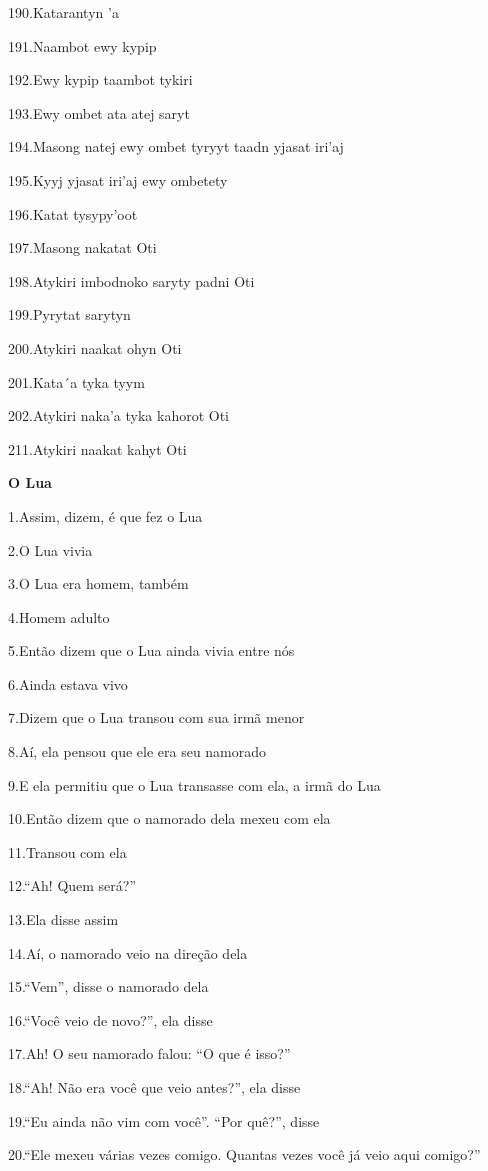 190.Katarantyn 'a

191.Naambot ewy kypip

192.Ewy kypip taambot tykiri

193.Ewy ombet ata atej saryt

194.Masong natej ewy ombet tyryyt taadn yjasat iri'aj

195.Kyyj yjasat iri'aj ewy ombetety

196.Katat tysypy'oot

197.Masong nakatat Oti

198.Atykiri imbodnoko saryty padni Oti

199.Pyrytat sarytyn

200.Atykiri naakat ohyn Oti

201.Kata´a tyka tyym

202.Atykiri naka'a tyka kahorot Oti

211.Atykiri naakat kahyt Oti

\textbf{O Lua}

1.Assim, dizem, é que fez o Lua

2.O Lua vivia

3.O Lua era homem, também

4.Homem adulto

5.Então dizem que o Lua ainda vivia entre nós

6.Ainda estava vivo

7.Dizem que o Lua transou com sua irmã menor

8.Aí, ela pensou que ele era seu namorado

9.E ela permitiu que o Lua transasse com ela, a irmã do Lua

10.Então dizem que o namorado dela mexeu com ela

11.Transou com ela

12.``Ah! Quem será?''

13.Ela disse assim

14.Aí, o namorado veio na direção dela

15.``Vem'', disse o namorado dela

16.``Você veio de novo?'', ela disse

17.Ah! O seu namorado falou: ``O que é isso?''

18.``Ah! Não era você que veio antes?'', ela disse

19.``Eu ainda não vim com você''. ``Por quê?'', disse

20.``Ele mexeu várias vezes comigo. Quantas vezes você já veio aqui
comigo?''

